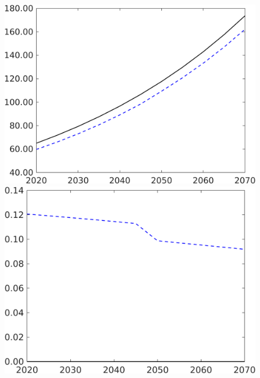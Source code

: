 \begin{figure}[h!!]
\begin{minipage}[]{0.32\textwidth}
	\end{minipage}
	\begin{minipage}[]{0.32\textwidth}
		\includegraphics[width=1\textwidth]{../../codding_model/own_basedOnFried/optimalPol_190722_tidiedUp/figures/all_10Aout22/CountTaul_modxgr_nsk_target_Emnet_spillover0_sep1_extern0_PV1_etaa0.79_lgd0.png}
	\end{minipage}
	\begin{minipage}[]{0.32\textwidth}
		\includegraphics[width=1\textwidth]{../../codding_model/own_basedOnFried/optimalPol_190722_tidiedUp/figures/all_10Aout22/CountTaul_modxgr_nsk_target_taul_spillover0_sep1_extern0_PV1_etaa0.79_lgd0.png}
	\end{minipage}
\end{figure} 


